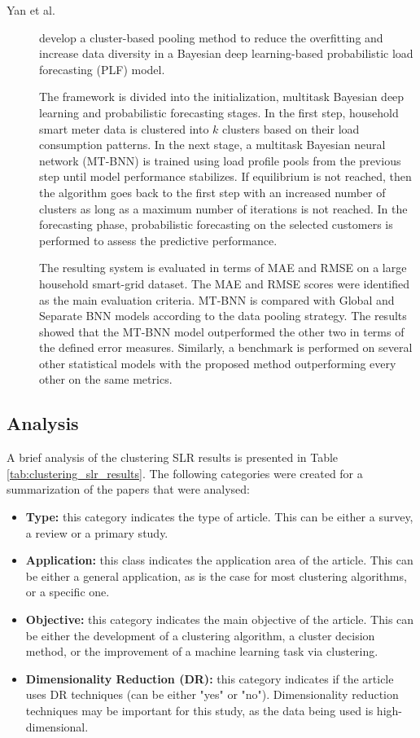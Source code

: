 \begin{description}
    \item[Yan et al.]\cite{Yang.Li.ea_BayesianDeepLearningBased_2020} develop a cluster-based pooling method to reduce the overfitting and increase data diversity in a Bayesian deep learning-based probabilistic load forecasting (PLF) model. 
    
    The framework is divided into the initialization, multitask Bayesian deep learning and probabilistic forecasting stages. In the first step, household smart meter data is clustered into $k$ clusters based on their load consumption patterns. In the next stage, a multitask Bayesian neural network (MT-BNN) is trained using load profile pools from the previous step until model performance stabilizes. If equilibrium is not reached, then the algorithm goes back to the first step with an increased number of clusters as long as a maximum number of iterations is not reached. In the forecasting phase, probabilistic forecasting on the selected customers is performed to assess the predictive performance.

    The resulting system is evaluated in terms of MAE and RMSE on a large household smart-grid dataset. The MAE and RMSE scores were identified as the main evaluation criteria. MT-BNN is compared with Global and Separate BNN models according to the data pooling strategy. The results showed that the MT-BNN model outperformed the other two in terms of the defined error measures. Similarly, a benchmark is performed on several other statistical models with the proposed method outperforming every other on the same metrics. 
\end{description}

\subsection{Analysis}\label{sec:sota_clustering_analysis}
A brief analysis of the clustering SLR results is presented in Table \ref{tab:clustering_slr_results}. The following categories were created for a summarization of the papers that were analysed:

\begin{itemize}
    \item \textbf{Type:} this category indicates the type of article. This can be either a survey, a review or a primary study.
    \item \textbf{Application:} this class indicates the application area of the article. This can be either a general application, as is the case for most clustering algorithms, or a specific one.
    \item \textbf{Objective:} this category indicates the main objective of the article. This can be either the development of a clustering algorithm, a cluster decision method, or the improvement of a machine learning task via clustering.
    \item \textbf{Dimensionality Reduction (DR):} this category indicates if the article uses DR techniques (can be either "yes" or "no"). Dimensionality reduction techniques may be important for this study, as the data being used is high-dimensional. 
\end{itemize}


